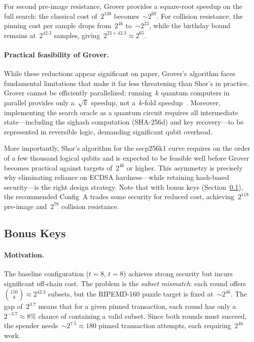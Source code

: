 \documentclass[11pt, a4paper]{article}
\begin{document}
\noindent For second pre-image resistance, Grover provides a square-root speedup on the full search: the classical cost of~$2^{138}$ becomes~${\sim}2^{69}$. For collision resistance, the pinning cost per sample drops from~$2^{46}$ to~${\sim}2^{23}$, while the birthday bound remains at~$2^{42.3}$ samples, giving~$2^{23 + 42.3} \approx 2^{65}$.

\paragraph{Practical feasibility of Grover.}
While these reductions appear significant on paper, Grover's algorithm faces fundamental limitations that make it far less threatening than Shor's in practice. Grover cannot be efficiently parallelized: running~$k$ quantum computers in parallel provides only a~$\sqrt{k}$ speedup, not a~$k$-fold speedup~\cite{grover1996}. Moreover, implementing the search oracle as a quantum circuit requires all intermediate state---including the sighash computation (SHA-256d) and key recovery---to be represented in reversible logic, demanding significant qubit overhead.

More importantly, Shor's algorithm for the secp256k1 curve requires on the order of a few thousand logical qubits and is expected to be feasible well before Grover becomes practical against targets of~$2^{46}$ or higher. This asymmetry is precisely why eliminating reliance on ECDSA hardness---while retaining hash-based security---is the right design strategy. Note that with bonus keys (Section~\ref{sec:bonus-keys}), the recommended Config~A trades some security for reduced cost, achieving~$2^{118}$ pre-image and~$2^{78}$ collision resistance.

\subsection{Bonus Keys}
\label{sec:bonus-keys}

\paragraph{Motivation.}
The baseline configuration ($t = 8$, $t = 8$) achieves strong security but incurs significant off-chain cost. The problem is the \emph{subset mismatch}: each round offers $\binom{150}{8} \approx 2^{42.3}$ subsets, but the RIPEMD-160 puzzle target is fixed at~${\sim}2^{46}$. The gap of~$2^{3.7}$ means that for a given pinned transaction, each round has only a~$2^{-3.7} \approx 8\%$ chance of containing a valid subset. Since both rounds must succeed, the spender needs~${\sim}2^{7.5} \approx 180$ pinned transaction attempts, each requiring~$2^{46}$ work.
\end{document}
